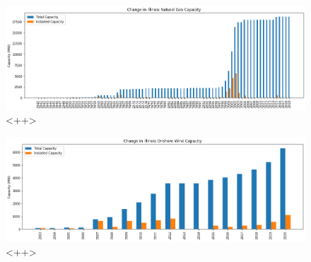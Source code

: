 \begin{figure}[ht]
	\centering
	\includegraphics[width=\columnwidth]{./img/annual_installed_cap_natgas.png}
	\caption{<++>}
	\label{fig:bau}
\end{figure}
\begin{figure}[ht]
	\centering
	\includegraphics[width=\columnwidth]{./img/annual_installed_cap_utilitywind.png}
        \caption{<++>}
	\label{fig:bau}
\end{figure}


